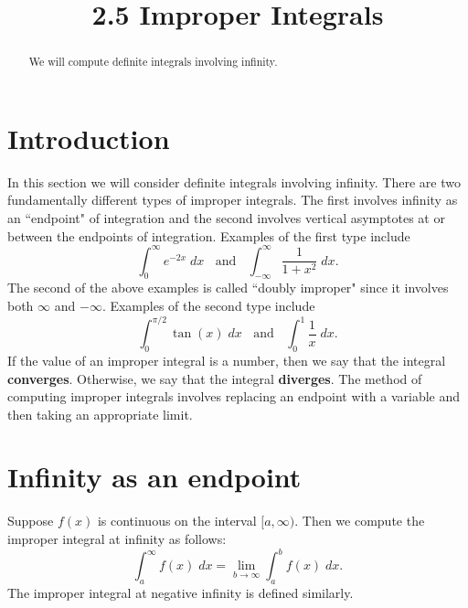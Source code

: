 \documentclass[handout]{ximera}
\title{2.5 Improper Integrals}
\begin{document}
\begin{abstract}
We will compute definite integrals involving infinity.
\end{abstract}

\maketitle

\section{Introduction}
In this section we will consider definite integrals involving infinity.
There are two fundamentally different types of improper integrals.  The first involves infinity as an ``endpoint"
of integration and the second involves vertical asymptotes at or between the endpoints of integration.
Examples of the first type include
\[
\int_0^\infty e^{-2x} \; dx \; \; \text{ and } \;  \; \int_{-\infty}^\infty \frac{1}{1+x^2}\; dx.
\]
The second of the above examples is called ``doubly improper" since it involves both $\infty$ and $-\infty$.
Examples of the second type include
\[
\int_0^{\pi/2} \tan(x)\; dx \; \; \text{ and } \; \; \int_0^1 \frac{1}{x} \; dx.
\]
If the value of an improper integral is a number, then we say that the integral \textbf{converges}.
Otherwise, we say that the integral \textbf{diverges}.
The method of computing improper integrals involves replacing an endpoint with a variable 
and then taking an appropriate limit.




\section{Infinity as an endpoint}
\begin{definition}
Suppose $f(x)$ is continuous on the interval $[a, \infty)$. Then we compute the improper integral at infinity as follows:
\[
\int_a^\infty f(x) \; dx = \lim_{b \to \infty} \int_a^b f(x) \; dx.
\]
The improper integral at negative infinity is defined similarly.
\end{definition}
\end{document}
